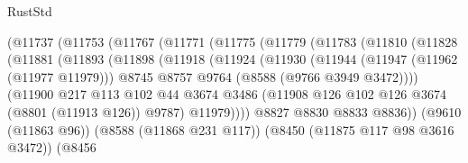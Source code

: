 \begin{lexlean}{RustStd}
\begin{coremodule}
                          (@11737
                            (@11753
                              (@11767
                                (@11771
                                  (@11775
                                    (@11779
                                      (@11783
                                        (@11810
                                          (@11828
                                            (@11881
                                              (@11893
                                                (@11898
                                                  (@11918
                                                    (@11924
                                                      (@11930
                                                        (@11944
                                                          (@11947 (@11962 (@11977 @11979)))
                                                          @8745
                                                          @8757
                                                          @9764
                                                          (@8588 (@9766 @3949 @3472))))
                                                      (@11900
                                                        @217
                                                        @113
                                                        @102
                                                        @44
                                                        @3674
                                                        @3486
                                                        (@11908
                                                          @126
                                                          @102
                                                          @126
                                                          @3674
                                                          (@8801 (@11913 @126))
                                                          @9787)
                                                        @11979))))
                                                @8827
                                                @8830
                                                @8833
                                                @8836))
                                            (@9610 (@11863 @96))
                                            (@8588 (@11868 @231 @117))
                                            (@8450 (@11875 @117 @98 @3616 @3472))
                                            (@8456

\end{coremodule}
\end{lexlean}
